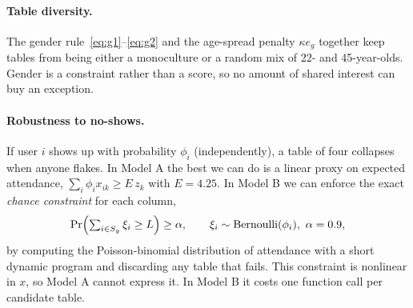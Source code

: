 \documentclass[10pt]{article}
\begin{document}
\paragraph{Table diversity.} The gender rule~\eqref{eq:g1}--\eqref{eq:g2} and the age-spread penalty $\kappa e_g$ together keep tables from being either a monoculture or a random mix of 22- and 45-year-olds. Gender is a constraint rather than a score, so no amount of shared interest can buy an exception.

\paragraph{Robustness to no-shows.} If user $i$ shows up with probability $\phi_i$ (independently), a table of four collapses when anyone flakes. In Model A the best we can do is a linear proxy on expected attendance, $\sum_i\phi_i x_{ik}\ge E\,z_k$ with $E=4.25$. In Model B we can enforce the exact \emph{chance constraint} for each column,
\begin{equation}
\Pr\Bigl(\textstyle\sum_{i\in S_g}\xi_i\ge L\Bigr)\ge \alpha,\qquad \xi_i\sim\text{Bernoulli}(\phi_i),\ \alpha=0.9,
\end{equation}
by computing the Poisson-binomial distribution of attendance with a short dynamic program and discarding any table that fails. This constraint is nonlinear in $x$, so Model A cannot express it. In Model B it costs one function call per candidate table.



\clearpage

\end{document}
